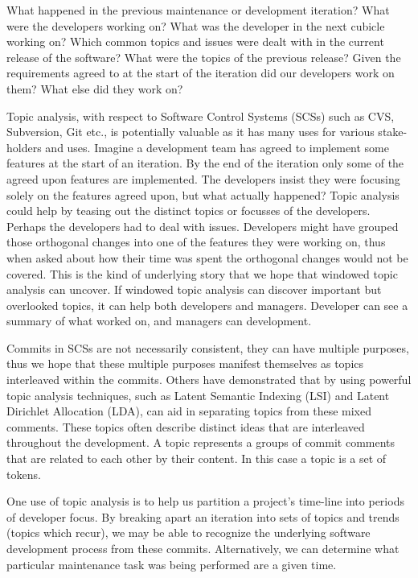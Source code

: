 \documentclass[times, 10pt,twocolumn]{article}
\begin{document}


What happened in the previous maintenance or development iteration? What were the developers
working on? What was the developer in the next cubicle working on?
Which common topics and issues were dealt with in the current
release of the software? What were the topics of the previous release?
Given the requirements agreed to at the start of the iteration did our
developers work on them? What else did they work on?

Topic analysis, with respect to Software Control Systems (SCSs) such
as CVS, Subversion, Git etc., is potentially valuable as it has many
uses for various stake-holders and uses.  Imagine a development team
has agreed to implement some features at the start of an iteration. By
the end of the iteration only some of the agreed upon features are
implemented. The developers insist they were focusing solely on the
features agreed upon, but what actually happened? Topic analysis could
help by teasing out the distinct topics or focusses of the
developers. Perhaps the developers had to deal with issues.
Developers might have grouped those orthogonal changes into one of the
features they were working on, thus when asked about how their time
was spent the orthogonal changes would not be covered. This is the kind of underlying story that we
hope that windowed topic analysis can uncover. If windowed topic
analysis can discover important but overlooked topics, it can help
both developers and managers. Developer can see a summary of what
worked on, and managers can development.


Commits in SCSs are not necessarily consistent, they can have multiple
purposes, thus we hope that these multiple purposes manifest themselves as
topics interleaved within the commits.   Others have demonstrated that by
using powerful topic analysis techniques, such as Latent Semantic Indexing
(LSI) and Latent Dirichlet Allocation (LDA), can aid in separating topics
from these mixed comments. These topics often describe distinct ideas
that are interleaved throughout the development. A topic represents a
groups of commit comments that are related to each other by their
content.  In this case a topic is a set of tokens.



One use of topic analysis is to help us partition a project's
time-line into periods of developer focus. By breaking apart an
iteration into sets of topics and trends (topics which recur), we may
be able to recognize the underlying software development process from
these commits. Alternatively, we can determine what particular
maintenance task was being performed are a given time.
\end{document}
